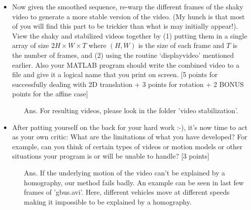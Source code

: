 \documentclass[11pt]{article}
\begin{document}
\begin{enumerate}
\begin{itemize}
\item Now given the smoothed sequence, re-warp the different frames of the shaky video to generate a more stable version of the video. (My hunch is that most of you will find this part to be trickier than what is may initially appear!). View the shaky and stabilized videos together by (1) putting them in a single array of size $2H \times W \times T$ where $(H,W)$ is the size of each frame and $T$ is the number of frames, and (2) using the routine `displayvideo' mentioned earlier.  Also your MATLAB program should write the combined video to a file and give it a logical name that you print on screen. \textsf{[5 points for successfully dealing with 2D translation + 3 points for rotation + 2 BONUS points for the affine case]}
\begin{itemize}
	\item[Ans.] For resulting videos, please look in the folder 'video stabilization'.	
\end{itemize}
	
\item After patting yourself on the back for your hard work :-), it's now time to act as your own critic: What are the limitations of what you have developed? For example, can you think of certain types of videos or motion models or other situations your program is or will be unable to handle? \textsf{[3 points]}

\begin{itemize}
	\item[Ans.] If the underlying motion of the video can't be explained by a homography, our method fails badly. An example can be seen in last few frames of 'gbus.avi'. Here, different vehicles move at different speeds making it impossible to be explained by a homography.
\end{itemize}

\end{itemize}


\end{enumerate}
\end{document}
